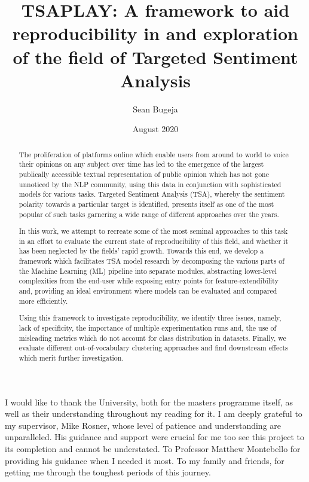\documentclass[12pt, a4paper]{report}
\theoremstyle{definition}
\theoremstyle{definition}%
\theoremstyle{definition}%
\theoremstyle{definition}%
\theoremstyle{definition}%
\theoremstyle{definition}%
\begin{document}
\title{TSAPLAY: A framework to aid reproducibility in and exploration of the field of Targeted Sentiment Analysis}
\author{Sean Bugeja}
\date{August 2020}

\frontmatter


\begin{acknowledgements}
I would like to thank the University, both for the masters programme itself, as well as their understanding throughout my reading for it. 
I am deeply grateful to my supervisor, Mike Rosner, whose level of patience and understanding are unparalleled. His guidance and support were crucial for me too see this project to its completion and cannot be understated. To Professor Matthew Montebello for providing his guidance when I needed it most. To my family and friends, for getting me through the toughest periods of this journey.  
\end{acknowledgements}

\begin{abstract}
	The proliferation of platforms online which enable users from around to world to voice their opinions on any subject over time has led to the emergence of the largest publically accessible textual representation of public opinion which has not gone unnoticed by the NLP community, using this data in conjunction with sophisticated models for various tasks. Targeted Sentiment Analysis (TSA), whereby the sentiment polarity towards a particular target is identified, presents itself as one of the most popular of such tasks garnering a wide range of different approaches over the years.

	In this work, we attempt to recreate some of the most seminal approaches to this task in an effort to evaluate the current state of reproducibility of this field, and whether it has been neglected by the fields' rapid growth. Towards this end, we develop a framework which facilitates TSA model research by decomposing the various parts of the Machine Learning (ML) pipeline into separate modules, abstracting lower-level complexities from the end-user while exposing entry points for feature-extendibility and, providing an ideal environment where models can be evaluated and compared more efficiently.

	Using this framework to investigate reproducibility, we identify three issues, namely, lack of specificity, the importance of multiple experimentation runs and, the use of misleading metrics which do not account for class distribution in datasets. Finally, we evaluate different out-of-vocabulary clustering approaches and find downstream effects which merit further investigation. 
\end{abstract}
{\hypersetup{linkcolor=black}
\tableofcontents

\listoffigures

\listoftables
}
\end{document}
